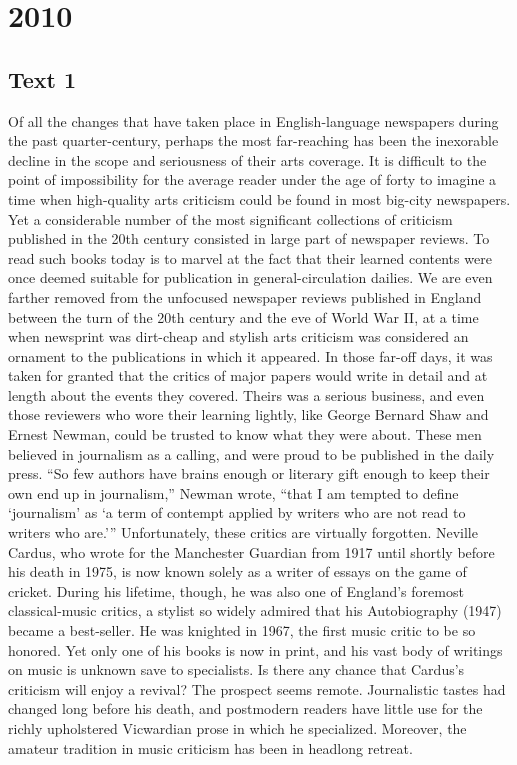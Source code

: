 
\section{2010}
\subsection{Text 1}
Of all the changes that have taken place in English-language newspapers during the past quarter-century, perhaps the most far-reaching has been the inexorable decline in the scope and seriousness of their arts coverage. 
It is difficult to the point of impossibility for the average reader under the age of forty to imagine a time when high-quality arts criticism could be found in most big-city newspapers. Yet a considerable number of the most significant collections of criticism published in the 20th century consisted in large part of newspaper reviews. To read such books today is to marvel at the fact that their learned contents were once deemed suitable for publication in general-circulation dailies.
We are even farther removed from the unfocused newspaper reviews published in England between the turn of the 20th century and the eve of World War II, at a time when newsprint was dirt-cheap and stylish arts criticism was considered an ornament to the publications in which it appeared. In those far-off days, it was taken for granted that the critics of major papers would write in detail and at length about the events they covered. Theirs was a serious business, and even those reviewers who wore their learning lightly, like George Bernard Shaw and Ernest Newman, could be trusted to know what they were about. These men believed in journalism as a calling, and were proud to be published in the daily press. “So few authors have brains enough or literary gift enough to keep their own end up in journalism,” Newman wrote, “that I am tempted to define ‘journalism’ as ‘a term of contempt applied by writers who are not read to writers who are.’”
Unfortunately, these critics are virtually forgotten. Neville Cardus, who wrote for the Manchester Guardian from 1917 until shortly before his death in 1975, is now known solely as a writer of essays on the game of cricket. During his lifetime, though, he was also one of England’s foremost classical-music critics, a stylist so widely admired that his Autobiography (1947) became a best-seller. He was knighted in 1967, the first music critic to be so honored. Yet only one of his books is now in print, and his vast body of writings on music is unknown save to specialists.
Is there any chance that Cardus’s criticism will enjoy a revival? The prospect seems remote. Journalistic tastes had changed long before his death, and postmodern readers have little use for the richly upholstered Vicwardian prose in which he specialized. Moreover, the amateur tradition in music criticism has been in headlong retreat.
